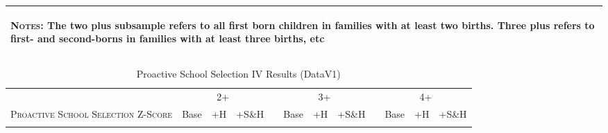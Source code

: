 \begin{landscape}
\begin{table}[htpb!]
\begin{center}
\begin{tabular}{lcccp{2mm}cccp{2mm}ccc}
\midrule\multicolumn{12}{p{19.2cm}}{\begin{footnotesize}\textsc{Notes:} The two plus subsample refers to all first born children in families with at least two births.  Three plus refers to first- and second-borns in families with at least three births, etc\end{footnotesize}} \\ \bottomrule 
\end{tabular}\end{center}\end{table}\end{landscape}\begin{landscape}\begin{table}[htpb!]\caption{Proactive School Selection IV Results (DataV1)}
\label{TWINtab:IVAll}
\begin{center}\begin{tabular}{lcccp{2mm}cccp{2mm}ccc}
\toprule \toprule 
&\multicolumn{3}{c}{2+}&&\multicolumn{3}{c}{3+}&&\multicolumn{3}{c}{4+}\\ \cmidrule(r){2-4} \cmidrule(r){6-8} \cmidrule(r){10-12} 
\textsc{Proactive School Selection Z-Score}&Base&+H&+S\&H&&Base&+H&+S\&H&&Base&+H&+S\&H\\ \midrule 
\begin{footnotesize}\end{footnotesize}& 
\begin{footnotesize}\end{footnotesize}& 
\begin{footnotesize}\end{footnotesize}& 
\begin{footnotesize}\end{footnotesize}& 
\begin{footnotesize}\end{footnotesize}& 
\begin{footnotesize}\end{footnotesize}& 
\begin{footnotesize}\end{footnotesize}& 
\begin{footnotesize}\end{footnotesize}& 
\begin{footnotesize}\end{footnotesize}& 
\begin{footnotesize}\end{footnotesize}& 
\begin{footnotesize}\end{footnotesize}& 

\end{tabular}
\end{center}
\end{table}
\end{landscape}
